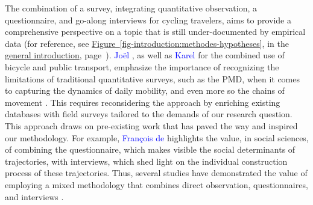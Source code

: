 \begin{refsegment}
The combination of a  survey, integrating quantitative observation, a questionnaire, and go-along interviews for cycling travelers, aims to provide a comprehensive perspective on a topic that is still under-documented by empirical data (for reference, see \hyperref[fig-introduction:methodes-hypotheses]{Figure~\ref{fig-introduction:methodes-hypotheses}}, in the \hyperref[introduction-generale:methodologie]{general introduction}, page~\pageref{fig-introduction:methodes-hypotheses}). \textcolor{blue}{Joël} \textcolor{blue}{\textcite[24]{meissonnier_pour_2012}}, as well as \textcolor{blue}{Karel} \textcolor{blue}{\textcite[291]{martens_bicycle_2004}} for the combined use of \gls{bicycle} and public transport, emphasize the importance of recognizing the limitations of traditional quantitative surveys, such as the \acrfull{PMD}, when it comes to capturing the dynamics of daily mobility, and even more so the chains of movement \textcolor{blue}{\autocite[10]{kieffer_chainage_2011}}. This requires reconsidering the approach by enriching existing databases with field surveys tailored to the demands of our research question. This approach draws on pre-existing work that has paved the way and inspired our methodology. For example, \textcolor{blue}{François de} \textcolor{blue}{\textcite[42]{singly_questionnaire_2016}} highlights the value, in social sciences, of combining the questionnaire, which makes visible the social determinants of trajectories, with interviews, which shed light on the individual construction process of these trajectories. Thus, several studies have demonstrated the value of employing a mixed methodology that combines direct observation, questionnaires, and  interviews \textcolor{blue}{\autocites[258]{greene_toward_1989}[120]{bergeron_uncovering_2014}[3]{despres_replacer_2019}}.%


\end{refsegment}
